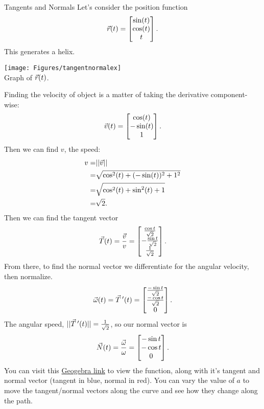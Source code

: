 \begin{example}{Tangents and Normals}
Let's consider the position function $$\vec{r}(t)=\begin{bmatrix}\sin(t)\\ \cos(t)\\t\end{bmatrix}. $$
This generates a helix.
\begin{center}
\texttt{[image: Figures/tangentnormalex]}
\\
Graph of $\vec{r}(t)$.
\end{center}
\vspace{1em}
Finding the velocity of object is a matter of taking the derivative component-wise:
$$\vec{v}(t)=\begin{bmatrix}\cos(t)\\-\sin(t)\\1\end{bmatrix}. $$
Then we can find $v$, the speed:
\begin{align*}
v=&||\vec{v}||\\
=&\sqrt{\cos^2(t)+(-\sin(t))^2+1^2}\\
=&\sqrt{\cos^2(t)+\sin^2(t)+1}\\
=&\sqrt{2}.
\end{align*}
Then we can find the tangent vector $$\vec{T}(t)=\frac{\vec{v}}{v}=\begin{bmatrix}\frac{\cos t}{\sqrt2}\\ -\frac{\sin t}{\sqrt2}\\ \frac{1}{\sqrt{2}}\end{bmatrix}.$$
From there, to find the normal vector we differentiate for the angular velocity, then normalize.
$$\vec{\omega}(t)=\vec{T}\hspace{0.2em}'(t)=\begin{bmatrix}\frac{-\sin t}{\sqrt{2}}\\ \frac{-\cos t}{\sqrt{2}}\\ 0\end{bmatrix}.$$
The angular speed, $||\vec{T}\hspace{0.2em}'(t)||=\frac{1}{\sqrt{2}}$, so our normal vector is $$\vec{N}(t)=\frac{\vec{\omega}}{\omega}=\begin{bmatrix}-\sin t\\ -\cos t\\ 0\end{bmatrix}. $$
You can visit this \href{https://www.geogebra.org/3d/rfrp5b9b}{Geogebra link} to view the function, along with it's tangent and normal vector (tangent in blue, normal in red). You can vary the value of $a$ to move the tangent/normal vectors along the curve and see how they change along the path.
\end{example}


